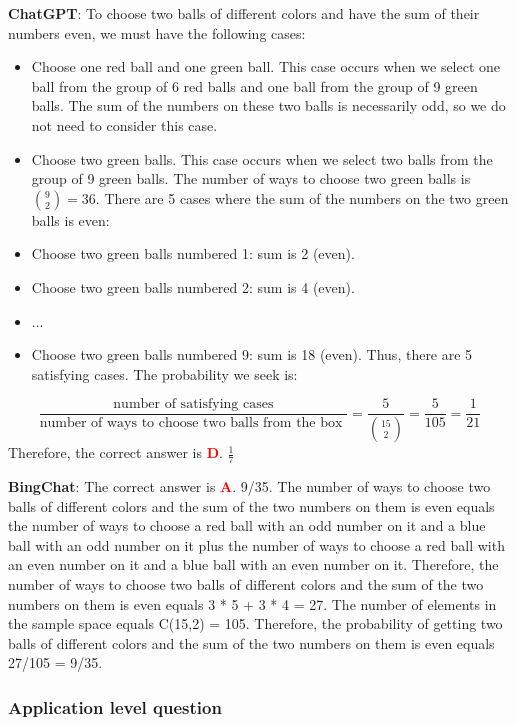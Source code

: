 \documentclass{article}
\begin{document}
{\begin{mdframed}[linewidth=1pt,linecolor=red]
		\textbf{ChatGPT}: To choose two balls of different colors and have the sum of their numbers even, we must have the following cases:
		\begin{itemize}
			\item Choose one red ball and one green ball. This case occurs when we select one ball from the group of 6 red balls and one ball from the group of 9 green balls. The sum of the numbers on these two balls is necessarily odd, so we do not need to consider this case.
			\item Choose two green balls. This case occurs when we select two balls from the group of 9 green balls. The number of ways to choose two green balls is $\binom{9}{2}=36$. There are 5 cases where the sum of the numbers on the two green balls is even:
			\item Choose two green balls numbered 1: sum is 2 (even).
			\item Choose two green balls numbered 2: sum is 4 (even).
			\item ...
			\item Choose two green balls numbered 9: sum is 18 (even). Thus, there are 5 satisfying cases. The probability we seek is:
		\end{itemize}
		$$\frac{\text{number of satisfying cases}}{\text{number of ways to choose two balls from the box
		}} = \frac{5}{\binom{15}{2}} = \frac{5}{105} = \frac{1}{21}$$ 
		Therefore, the correct answer is \textcolor{red}{\textbf{D}}. $\frac{1}{7}$
		
		\textbf{BingChat}: The correct answer is \textcolor{red}{\textbf{A}}. 9/35. The number of ways to choose two balls of different colors and the sum of the two numbers on them is even equals the number of ways to choose a red ball with an odd number on it and a blue ball with an odd number on it plus the number of ways to choose a red ball with an even number on it and a blue ball with an even number on it. Therefore, the number of ways to choose two balls of different colors and the sum of the two numbers on them is even equals 3 * 5 + 3 * 4 = 27. The number of elements in the sample space equals C(15,2) = 105. Therefore, the probability of getting two balls of different colors and the sum of the two numbers on them is even equals 27/105 = 9/35.
		
	\end{mdframed}
	
	\subsubsection{Application level question}
	\label{VNHSGE_Math_A}
	
}
\end{document}
